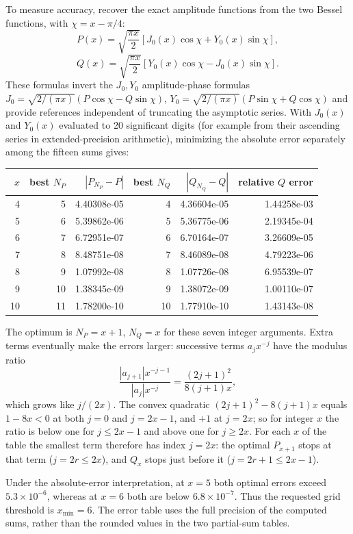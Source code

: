 To measure accuracy, recover the exact amplitude functions from
the two Bessel functions, with $\chi=x-\pi/4$:
\[
P(x)=\sqrt{\frac{\pi x}{2}}
[J_0(x)\cos\chi+Y_0(x)\sin\chi],
\]
\[
Q(x)=\sqrt{\frac{\pi x}{2}}
[Y_0(x)\cos\chi-J_0(x)\sin\chi].
\]
These formulas invert the $J_0,Y_0$ amplitude-phase formulas
$J_0=\sqrt{2/(\pi x)}(P\cos\chi-Q\sin\chi)$,
$Y_0=\sqrt{2/(\pi x)}(P\sin\chi+Q\cos\chi)$
and provide references independent of truncating the asymptotic
series. With $J_0(x)$ and $Y_0(x)$ evaluated to 20 significant
digits (for example from their ascending series in
extended-precision arithmetic), minimizing the absolute error
separately among the fifteen sums gives:
\begin{center}\small
\begin{tabular}{r r r r r r}
\toprule
$x$ & best $N_P$ & $|P_{N_P}-P|$ & best $N_Q$ & $|Q_{N_Q}-Q|$ & relative $Q$ error\\
\midrule
4 & 5 & 4.40308e-05 & 4 & 4.36604e-05 & 1.44258e-03 \\
5 & 6 & 5.39862e-06 & 5 & 5.36775e-06 & 2.19345e-04 \\
6 & 7 & 6.72951e-07 & 6 & 6.70164e-07 & 3.26609e-05 \\
7 & 8 & 8.48751e-08 & 7 & 8.46089e-08 & 4.79223e-06 \\
8 & 9 & 1.07992e-08 & 8 & 1.07726e-08 & 6.95539e-07 \\
9 & 10 & 1.38345e-09 & 9 & 1.38072e-09 & 1.00110e-07 \\
10 & 11 & 1.78200e-10 & 10 & 1.77910e-10 & 1.43143e-08 \\
\bottomrule
\end{tabular}\normalsize
\end{center}
The optimum is $N_P=x+1$, $N_Q=x$ for these seven integer
arguments. Extra terms eventually make the errors larger:
successive terms $a_jx^{-j}$ have the modulus ratio
\[
\frac{|a_{j+1}|x^{-j-1}}{|a_j|x^{-j}}=\frac{(2j+1)^2}{8(j+1)x},
\]
which grows like $j/(2x)$. The convex quadratic
$(2j+1)^2-8(j+1)x$ equals $1-8x<0$ at both $j=0$ and $j=2x-1$,
and $+1$ at $j=2x$; so for integer $x$ the ratio is below one for
$j\le2x-1$ and above one for $j\ge2x$. For each $x$ of the
table the smallest term therefore has index $j=2x$: the optimal
$P_{x+1}$ stops at that term ($j=2r\le2x$), and $Q_x$ stops just
before it ($j=2r+1\le2x-1$).

Under the absolute-error interpretation, at $x=5$ both optimal
errors exceed $5.3\times10^{-6}$, whereas at $x=6$ both are
below $6.8\times10^{-7}$. Thus the requested grid threshold is
$\boxed{x_{\min}=6}$. The error table uses the full precision
of the computed sums, rather than the rounded values in the two
partial-sum tables.

